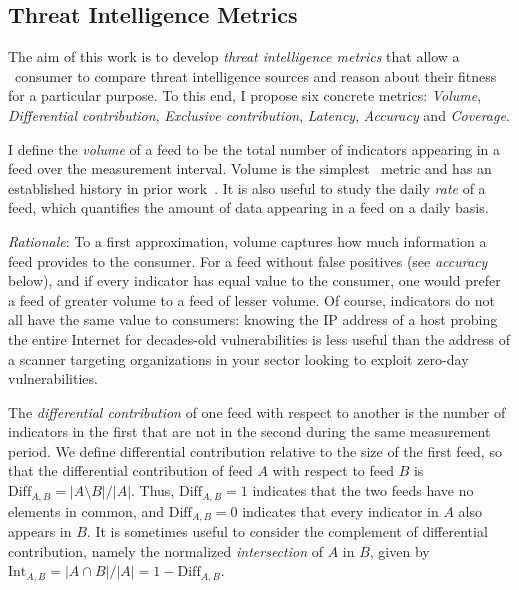 \subsection{Threat Intelligence Metrics}
\label{sec:metrics}

The aim of this work is to develop \emph{threat intelligence metrics} that
allow a \ti\ consumer to compare threat intelligence sources and reason about
their fitness for a particular purpose. To this end, I propose six concrete
metrics: \emph{Volume}, \emph{Differential contribution}, \emph{Exclusive contribution},
\emph{Latency}, \emph{Accuracy} and \emph{Coverage}.


\metrics {} I define the \emph{volume} of a feed to be the total
number of indicators appearing in a feed over the measurement interval. Volume
is the simplest \ti\ metric and has an established history in prior
work~\cite{jung2004empirical,kuhrer2014paint,
trajectory:oakland11,tasters:imc12,sheng2009empirical,sinha2008shades,thomas2016abuse}.
It is also useful to study the daily \emph{rate} of a feed, which quantifies
the amount of data appearing in a feed on a daily basis.

\emph{Rationale}: To a first approximation, volume captures how much
information a feed provides to the consumer. For a feed without false positives
(see \emph{accuracy} below), and if every indicator has equal value to the
consumer, one would prefer a feed of greater volume to a feed of lesser volume.
Of course, indicators do not all have the same value to consumers: knowing the
IP address of a host probing the entire Internet for decades-old
vulnerabilities is less useful than the address of a scanner targeting
organizations in your sector looking to exploit zero-day vulnerabilities.

\metrics {} The \emph{differential
contribution} of one feed with respect to another is the number of indicators
in the first that are not in the second during the same measurement period. We
define differential contribution relative to the size of the first feed, so
that the differential contribution of feed $A$ with respect to feed $B$ is
$\mathrm{Diff}_{A,B} = |A \setminus B|/|A|$. Thus, $\mathrm{Diff}_{A,B}=1$
indicates that the two feeds have no elements in common, and
$\mathrm{Diff}_{A,B} = 0$ indicates that every indicator in $A$ also appears in
$B$. It is sometimes useful to consider the complement
of differential contribution, namely the normalized \emph{intersection} of $A$ in $B$,
given by $\mathrm{Int}_{A,B} = |A \cap B|/|A| = 1-\mathrm{Diff}_{A,B}$.

